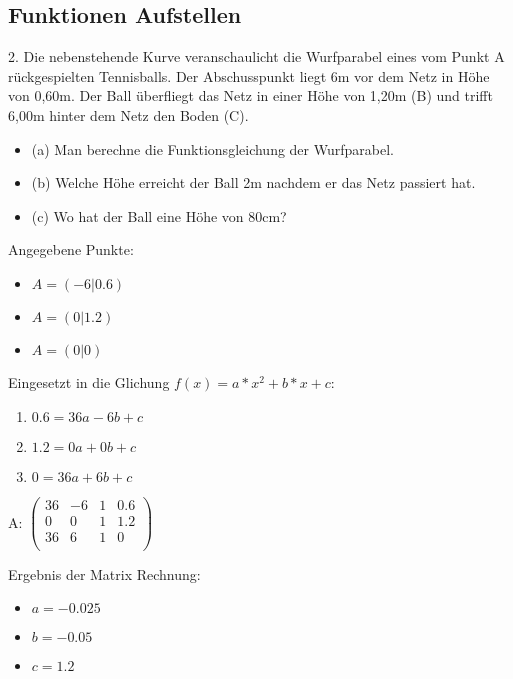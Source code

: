 \newpage
\subsection{Funktionen Aufstellen}

2.
Die nebenstehende Kurve veranschaulicht die Wurfparabel eines vom Punkt A
rückgespielten Tennisballs. Der Abschusspunkt liegt 6m vor dem Netz in Höhe
von 0,60m. Der Ball überfliegt das Netz in einer Höhe von 1,20m (B) und trifft
6,00m hinter dem Netz den Boden (C).\\

\begin{itemize}
    \item (a) Man berechne die Funktionsgleichung der Wurfparabel.
    \item (b) Welche Höhe erreicht der Ball 2m nachdem er das Netz passiert hat.
    \item (c) Wo hat der Ball eine Höhe von 80cm?
\end{itemize}

\hfill \break


Angegebene Punkte:
\begin{itemize}
    \item $A = (-6|0.6)$
    \item $A = (0|1.2)$
    \item $A = (0|0)$
\end{itemize}

\hfill \break

Eingesetzt in die Glichung $f(x)=a*x^2+b*x+c$:
\begin{enumerate}
    \item $0.6 = 36a-6b+c$
    \item $1.2 = 0a+0b+c$
    \item $0 = 36a+6b+c$
\end{enumerate}

\hfill \break

A:
$\left(\begin{array}{ccccc}
            36 & -6 & 1 & 0.6 \\
            0  & 0  & 1 & 1.2 \\
            36 & 6  & 1 & 0   \\
        \end{array}\right)$\\

\hfill \break

Ergebnis der Matrix Rechnung:
\begin{itemize}
    \item $a = -0.025$
    \item $b = -0.05$
    \item $c = 1.2$
\end{itemize}

